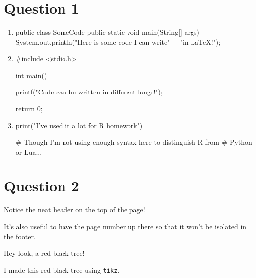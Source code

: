 \documentclass[11pt]{report}
\title{\textbf{\HomeworkTitle}}
\author{\HomeworkAuthor}
\date{\HomeworkDate}
\newcommand{\TextColor}{black}
\newcommand{\TextColor}{white}
\newcommand{\TextColor}{black}
\begin{document}
\maketitle

\section*{Question 1}
\begin{enumerate}[label = \alph*.]
	\item \begin{javacode}
			public class SomeCode {
				public static void main(String[] args) {
					System.out.println("Here is some code I can write" +
						"in LaTeX!");
				}
			}
	      \end{javacode}

	\item \begin{ccode}
			#include <stdio.h>

			int main() {
				printf("Code can be written in different langs!");

				return 0;
			}
	      \end{ccode}

	\item \begin{rcode}
		      print("I've used it a lot for R homework")

		      # Though I'm not using enough syntax here to distinguish R from
		      # Python or Lua...
	      \end{rcode}
\end{enumerate}

\newpage

\section*{Question 2}

Notice the neat header on the top of the page!

It's also useful to have the page number up there so that it won't be isolated in the footer.

Hey look, a red-black tree!

\begin{center}

	I made this red-black tree using \Verb|tikz|.
\end{center}
\end{document}
